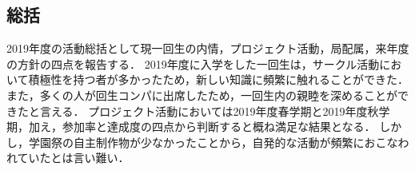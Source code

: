 \subsection*{\firstGrade{}総括}




2019年度の活動総括として現一回生の内情，プロジェクト活動，局配属，来年度の方針の四点を報告する．
2019年度に入学をした一回生は，サークル活動において積極性を持つ者が多かったため，新しい知識に頻繁に触れることができた．
また，多くの人が回生コンパに出席したため，一回生内の親睦を深めることができたと言える．
プロジェクト活動においては2019年度春学期と2019年度秋学期，加え，参加率と達成度の四点から判断すると概ね満足な結果となる．
しかし，学園祭の自主制作物が少なかったことから，自発的な活動が頻繁におこなわれていたとは言い難い．

